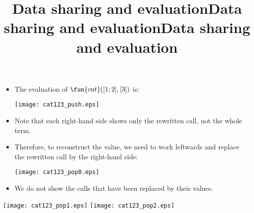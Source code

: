 \documentclass[wide]{slides}
\begin{document}
\begin{slide}
  \title{Data sharing and evaluation}

  \begin{itemize}

    \item The evaluation of \(\fun{cat}([1;2],[3])\) is:
      \bigskip
      \begin{center}
        \texttt{[image: cat123\_push.eps]}
      \end{center}

  \end{itemize}

\end{slide}

\begin{slide}
  \title{Data sharing and evaluation}

  \begin{itemize}

    \item Note that each right-hand side shows only the rewritten
      call, not the whole term.

    \item Therefore, to reconstruct the value, we need to work
      leftwards and replace the rewritten call by the right-hand side:
      \medskip
      \begin{center}
        \texttt{[image: cat123\_pop0.eps]}
        \bigskip
      \end{center}

    \item We do not show the calls that have been replaced by their
      values.

  \end{itemize}

\end{slide}

\begin{slide}
  \title{Data sharing and evaluation}

  \begin{center}
    \texttt{[image: cat123\_pop1.eps]}
    \qquad\quad
    \texttt{[image: cat123\_pop2.eps]}
  \end{center}

\end{slide}
\end{document}
